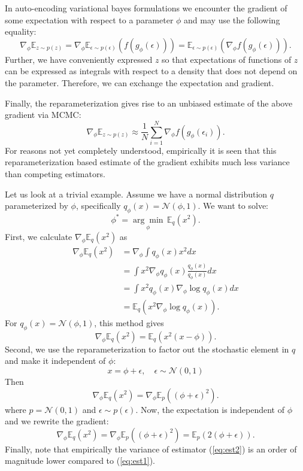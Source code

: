 \documentclass[11pt]{article}
\def\N{\mathcal{N}}
\def\E{\mathbb{E}}
\def\eps{\epsilon}
\begin{document}
In auto-encoding variational bayes formulations we encounter the gradient of some expectation with respect to a parameter $\phi$ and may use the following equality:
\begin{equation}
\nabla_\phi\E_{z\sim p(z)} = \nabla_\phi\E_{\eps\sim p(\eps)}(f(g_\phi(\eps))) = \E_{\eps\sim p(\eps)}(\nabla_\phi f(g_\phi(\eps))).
\end{equation}
Further, we have conveniently expressed $z$ so that expectations of functions of $z$ can be expressed as integrals with respect to a density that does not depend on the parameter. Therefore, we can exchange the expectation and gradient.

Finally, the reparameterization gives rise to an unbiased estimate of the above gradient via MCMC:
\begin{equation}
\nabla_\phi\E_{z\sim p(z)} \approx \frac{1}{N} \sum_{i=1}^N \nabla_\phi f(g_\phi(\eps_i)).
\end{equation}
For reasons not yet completely understood, empirically it is seen that this reparameterization based estimate of the gradient exhibits much less variance than competing estimators.

Let us look at a trivial example. Assume we have a normal distribution $q$ parameterized by $\phi$, specifically $q_\phi(x) = \N(\phi,1)$. We want to solve:
\begin{equation}
\phi^* = \underset{\phi}{\arg\min} \, \E_q(x^2).
\end{equation}
First, we calculate $\nabla_\phi\E_q(x^2)$ as
\begin{align}
\nabla_\phi\E_q(x^2)
&= \nabla_\phi \int q_\phi(x)x^2dx\\
&= \int x^2 \nabla_\phi q_\phi(x)\frac{q_\phi(x)}{q_\phi(x)}dx\\
&= \int x^2 q_\phi(x)\nabla_\phi\log q_\phi(x)dx\\
&= \E_q(x^2 \nabla_\phi \log q_\phi(x)).
\end{align}
For $q_\phi(x) = \N(\phi,1)$, this method gives
\begin{equation}
\nabla_\phi\E_q(x^2) = \E_q(x^2(x-\phi)).
\label{eq:est1}
\end{equation}
Second, we use the reparameterization to factor out the stochastic element in $q$ and make it independent of $\phi$:
\begin{equation}
x=\phi + \eps,\quad \eps\sim\N(0,1)
\end{equation}
Then
\begin{equation}
\nabla_\phi\E_q(x^2) = \nabla_\phi \E_p((\phi+\eps)^2).
\end{equation}
where $p=\N(0,1)$ and $\eps\sim p(\eps)$. Now, the expectation is independent of $\phi$ and we rewrite the gradient:
\begin{equation}
\nabla_\phi\E_q(x^2) = \nabla_\phi \E_p((\phi+\eps)^2) = \E_p(2(\phi+\eps)).
\label{eq:est2}
\end{equation}
Finally, note that empirically the variance of estimator (\ref{eq:est2}) is an order of magnitude lower compared to (\ref{eq:est1}).
\end{document}
